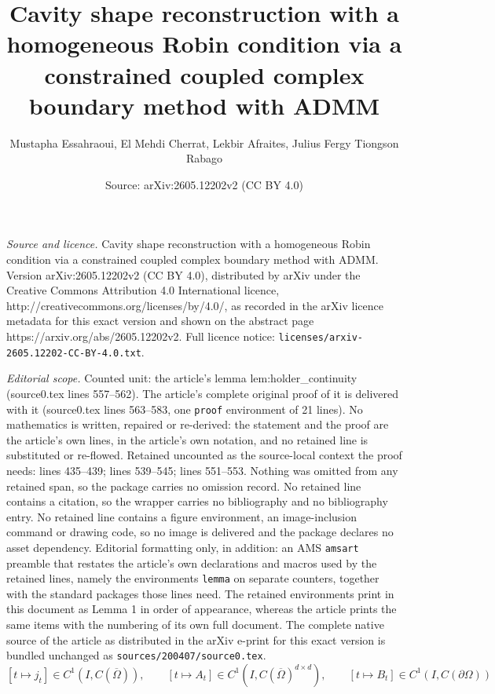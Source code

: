 \documentclass[10pt,a4paper]{amsart}
\title{Cavity shape reconstruction with a homogeneous Robin condition via a constrained coupled complex boundary method with ADMM}
\author{Mustapha Essahraoui, El Mehdi Cherrat, Lekbir Afraites, Julius Fergy Tiongson Rabago}
\date{Source: arXiv:2605.12202v2 (CC BY 4.0)}
\newcommand{\Jact}{j_{t}}
\newcommand{\intervalI}{I}
\begin{document}
\maketitle

\noindent\emph{Source and licence.} Cavity shape reconstruction with a homogeneous Robin condition via a constrained coupled complex boundary method with ADMM. Version arXiv:2605.12202v2 (CC BY 4.0), distributed by arXiv under the Creative Commons Attribution 4.0 International licence, http://creativecommons.org/licenses/by/4.0/, as recorded in the arXiv licence metadata for this exact version and shown on the abstract page https://arxiv.org/abs/2605.12202v2. Full licence notice: \texttt{licenses/arxiv-2605.12202-CC-BY-4.0.txt}.\par\smallskip

\noindent\textit{Editorial scope.} Counted unit: the article's lemma lem:holder\_continuity (source0.tex lines 557--562). The article's complete original proof of it is delivered with it (source0.tex lines 563--583, one \texttt{proof} environment of 21 lines). No mathematics is written, repaired or re-derived: the statement and the proof are the article's own lines, in the article's own notation, and no retained line is substituted or re-flowed.  Retained uncounted as the source-local context the proof needs: lines 435--439; lines 539--545; lines 551--553.  Nothing was omitted from any retained span, so the package carries no omission record.  No retained line contains a citation, so the wrapper carries no bibliography and no bibliography entry.  No retained line contains a figure environment, an image-inclusion command or drawing code, so no image is delivered and the package declares no asset dependency.  Editorial formatting only, in addition: an AMS \texttt{amsart} preamble that restates the article's own declarations and macros used by the retained lines, namely the environments \texttt{lemma} on separate counters, together with the standard packages those lines need.  The retained environments print in this document as Lemma 1 in order of appearance, whereas the article prints the same items with the numbering of its own full document.  The complete native source of the article as distributed in the arXiv e-print for this exact version is bundled unchanged as \texttt{sources/200407/source0.tex}.
\begin{equation}\label{eq:continuity_of_the_maps}
[t \mapsto {\Jact}] \in {C}^1(\intervalI,{C}(\overline{\varOmega})), \qquad
[t \mapsto A_t] \in {C}^1(\intervalI,{C}(\overline{\varOmega})^{d\times d}),\qquad
[t \mapsto B_t] \in {C}^1(\intervalI,{C}(\partial{\varOmega}))
\end{equation}
\end{document}
